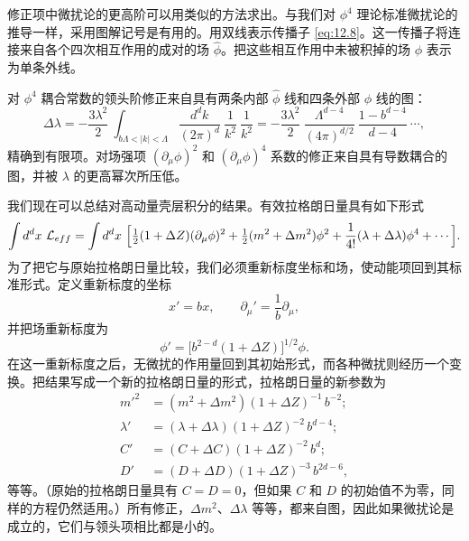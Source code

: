 修正项中微扰论的更高阶可以用类似的方法求出。与我们对 $\phi^4$ 理论标准微扰论的推导一样，采用图解记号是有用的。用双线表示传播子 \eqref{eq:12.8}。这一传播子将连接来自各个四次相互作用的成对的场 $\hat{\phi}$。把这些相互作用中未被积掉的场 $\phi$ 表示为单条外线。

对 $\phi^4$ 耦合常数的领头阶修正来自具有两条内部 $\hat{\phi}$ 线和四条外部 $\phi$ 线的图：
\begin{equation}
  \Delta\lambda = -\frac{3\lambda^2}{2}\ \int_{b\Lambda<|k|<\Lambda}
    \frac{d^dk}{(2\pi)^d}\ \frac{1}{k^2}\ \frac{1}{k^2}
  = -\frac{3\lambda^2}{2}\ \frac{\Lambda^{d-4}}{(4\pi)^{d/2}}\ \frac{1-b^{d-4}}
    {d-4}\ \cdots ,
  \label{eq:12.15}
\end{equation}
精确到有限项。对场强项 $(\partial_\mu\phi)^2$ 和 $(\partial_\mu\phi)^4$ 系数的修正来自具有导数耦合的图，并被 $\lambda$ 的更高幂次所压低。

我们现在可以总结对高动量壳层积分的结果。有效拉格朗日量具有如下形式
\begin{equation}
  \int d^dx\ \mathcal{L}_{eff} = \int d^dx\ \Bigl[
    \tfrac{1}{2}(1+\Delta Z)(\partial_\mu\phi)^2 + \tfrac{1}{2}
      (m^2+\Delta m^2)\phi^2 + \frac{1}{4!}(\lambda+\Delta\lambda)\phi^4
      + \cdots \Bigr] .
  \label{eq:12.18}
\end{equation}
为了把它与原始拉格朗日量比较，我们必须重新标度坐标和场，使动能项回到其标准形式。定义重新标度的坐标
\begin{equation}
  x' = bx,\qquad \partial_\mu' = \frac{1}{b}\partial_\mu ,
  \label{eq:12.19}
\end{equation}
并把场重新标度为
\begin{equation}
  \phi' = \bigl[ b^{2-d}(1+\Delta Z) \bigr]^{1/2}\phi .
  \label{eq:12.22}
\end{equation}
在这一重新标度之后，无微扰的作用量回到其初始形式，而各种微扰则经历一个变换。把结果写成一个新的拉格朗日量的形式，拉格朗日量的新参数为
\begin{equation}
  \begin{aligned}
    m'^2 &= (m^2+\Delta m^2)(1+\Delta Z)^{-1}\,b^{-2};\\
    \lambda' &= (\lambda+\Delta\lambda)(1+\Delta Z)^{-2}\,b^{d-4};\\
    C' &= (C+\Delta C)(1+\Delta Z)^{-2}\,b^d;\\
    D' &= (D+\Delta D)(1+\Delta Z)^{-3}\,b^{2d-6} ,
  \end{aligned}
  \label{eq:12.24}
\end{equation}
等等。（原始的拉格朗日量具有 $C = D = 0$，但如果 $C$ 和 $D$ 的初始值不为零，同样的方程仍然适用。）所有修正，$\Delta m^2$、$\Delta\lambda$ 等等，都来自图，因此如果微扰论是成立的，它们与领头项相比都是小的。

